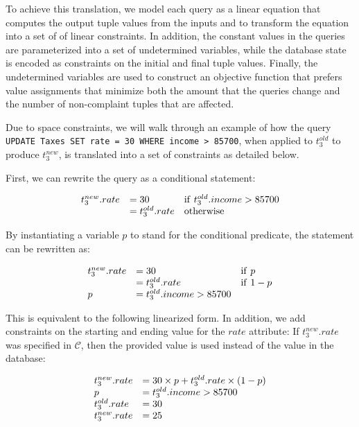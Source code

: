 To achieve this translation,
we model each query as a linear equation that computes the output
tuple values from the inputs and to transform the equation into a
set of of linear constraints. In addition, the constant values in
the queries are parameterized into a set of undetermined variables,
while the database state is encoded as constraints on the initial
and final tuple values. Finally, the undetermined variables are
used to construct an objective function that prefers value assignments
that minimize both the amount that the queries change and the number
of non-complaint tuples that are affected.

Due to space constraints, we will walk through an example of how the query
\texttt{UPDATE Taxes SET rate = 30 WHERE income > 85700}, when applied to 
$t_3^{old}$ to produce $t_3^{new}$, is translated into a set of constraints
as detailed below.

First, we can rewrite the query as a conditional statement:

\[
\begin{array}{l l l}
t_3^{new}.rate &= 30              &\mathrm{if}\ t_3^{old}.income > 85700 \\
               &= t_3^{old}.rate  &\mathrm{otherwise} \\
\end{array}
\]

By instantiating a variable $p$ to stand for the conditional predicate,
the statement can be rewritten as:

\[
\begin{array}{l l l}
t_3^{new}.rate &= 30              &\mathrm{if}\ p \\
               &= t_3^{old}.rate  &\mathrm{if}\ 1-p\\
p              &= t_3^{old}.income > 85700
\end{array}
\]

This is equivalent to the following linearized form.
In addition, we add constraints on the starting and ending value for the $rate$ attribute:
If $t_3^{new}.rate$ was specified in $\mathcal{C}$, then the provided value
is used instead of the value in the database:

\[
\begin{array}{l l l}
t_3^{new}.rate &= 30\times p + t_3^{old}.rate\times (1-p)\\
p              &= t_3^{old}.income > 85700\\
t_3^{old}.rate &= 30 \\
t_3^{new}.rate &= 25
\end{array}
\]

